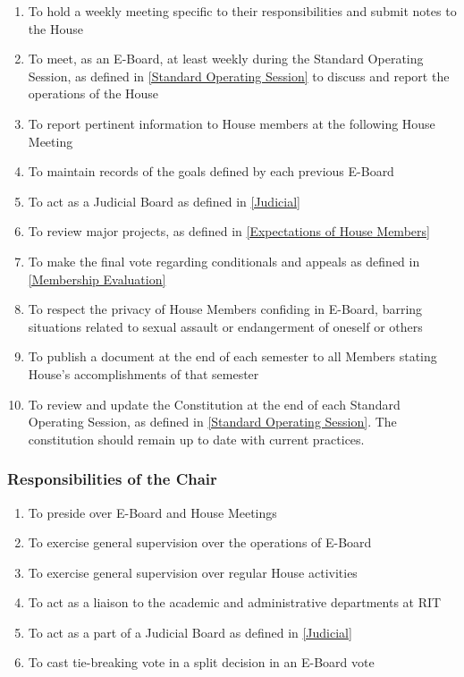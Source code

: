 \documentclass{article}
\newcommand{\asubsection}[1]{\subsubsection{#1} \label{#1}}
\begin{document}
\begin{enumerate}
	\item To hold a weekly meeting specific to their responsibilities and submit notes to the House
	\item To meet, as an E-Board, at least weekly during the Standard Operating Session, as defined in \ref{Standard Operating Session} to discuss and report the operations of the House
	\item To report pertinent information to House members at the following House Meeting
	\item To maintain records of the goals defined by each previous E-Board
	\item To act as a Judicial Board as defined in \ref{Judicial}
	\item To review major projects, as defined in \ref{Expectations of House Members}
	\item To make the final vote regarding conditionals and appeals as defined in \ref{Membership Evaluation}
	\item To respect the privacy of House Members confiding in E-Board, barring situations related to sexual assault or endangerment of oneself or others
	\item To publish a document at the end of each semester to all Members stating House’s accomplishments of that semester
	\item To review and update the Constitution at the end of each Standard Operating Session, as defined in \ref{Standard Operating Session}.
		The constitution should remain up to date with current practices.
\end{enumerate}

\asubsection{Responsibilities of the Chair}
\begin{enumerate}
	\item To preside over E-Board and House Meetings
	\item To exercise general supervision over the operations of E-Board
	\item To exercise general supervision over regular House activities
	\item To act as a liaison to the academic and administrative departments at RIT
	\item To act as a part of a Judicial Board as defined in \ref{Judicial}
	\item To cast tie-breaking vote in a split decision in an E-Board vote
\end{enumerate}
\end{document}
